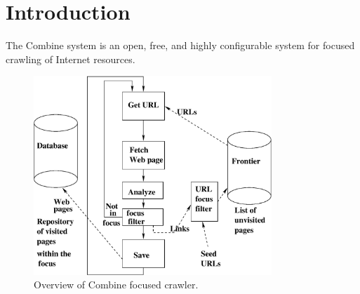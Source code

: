 \section{Introduction}


The Combine system is an open, free, and highly configurable system for focused crawling of Internet resources.

\begin{figure}[htb]
\begin{center}
 \includegraphics[height=0.3\textheight, width=0.8\textwidth]{focusedrobot.eps}
\end{center}
\caption{Overview of Combine focused crawler.}
\label{overview}
\end{figure}

